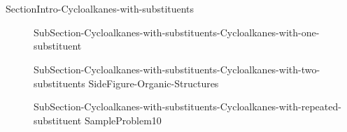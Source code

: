\documentclass[main.tex]{subfiles}
\newcommand\chapterlabel{Ch-orgo}\setcounter{figurenewcounter}{0}\setcounter{tablenewcounter}{0}\setcounter{formulanewcounter}{0}
\begin{document}
\section{\color{blue!30!black}{Cycloalkanes with substituents}}
{SectionIntro-Cycloalkanes-with-substituents}
\sloppy
\begin{description}
\item[]{SubSection-Cycloalkanes-with-substituents-Cycloalkanes-with-one-substituent}
\item[] {SubSection-Cycloalkanes-with-substituents-Cycloalkanes-with-two-substituents}
{SideFigure-Organic-Structures}
\item[]{SubSection-Cycloalkanes-with-substituents-Cycloalkanes-with-repeated-substituent}
{SampleProblem10}

\end{description}
\end{document}
